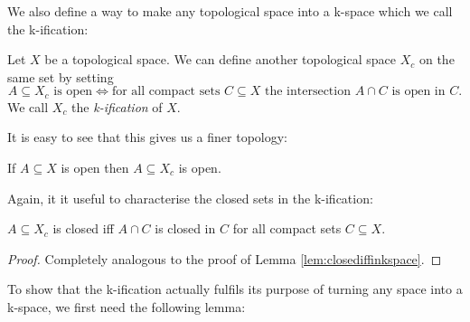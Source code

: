 We also define a way to make any topological space into a k-space which we call the k-ification: 

\begin{defi}
    Let $X$ be a topological space. 
    We can define another topological space $X_c$ on the same set by setting
    \[A \subseteq X_c \text{ is open} \iff \text{for all compact sets } C \subseteq X \text{ the intersection } A \cap C \text{ is open in } C.\] 
    \href{https://github.com/scholzhannah/CWComplexes/blob/7be4872a05b534011cc969eb5b80a4b7f0bf57e2/CWcomplexes/KSpace.lean#L122-L146}{\faExternalLink}
    We call $X_c$ the \emph{k-ification} of $X$.
    \href{https://github.com/scholzhannah/CWComplexes/blob/7be4872a05b534011cc969eb5b80a4b7f0bf57e2/CWcomplexes/KSpace.lean#L119-L120}{\faExternalLink}
\end{defi}

It is easy to see that this gives us a finer topology: 

\begin{lem}\label{lem:finertopology}
    If $A \subseteq X$ is open then $A \subseteq X_c$ is open. 
    \href{https://github.com/scholzhannah/CWComplexes/blob/7be4872a05b534011cc969eb5b80a4b7f0bf57e2/CWcomplexes/KSpace.lean#L187-L193}{\faExternalLink}
\end{lem}

Again, it it useful to characterise the closed sets in the k-ification: 

\begin{lem}\label{lem:closediffinkification}
    $A \subseteq X_c$ is closed iff $A \cap C$ is closed in $C$ for all compact sets $C \subseteq X$.
    \href{https://github.com/scholzhannah/CWComplexes/blob/7be4872a05b534011cc969eb5b80a4b7f0bf57e2/CWcomplexes/KSpace.lean#L148-L162}{\faExternalLink}
\end{lem}
\begin{proof}
    Completely analogous to the proof of Lemma \ref{lem:closediffinkspace}.
\end{proof}

To show that the k-ification actually fulfils its purpose of turning any space into a k-space, we first need the following lemma:

